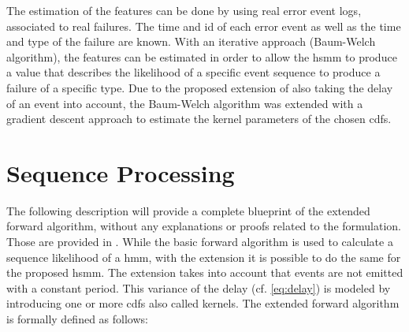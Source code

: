 \documentclass[mscthesis]{usiinfthesis}
\begin{document}
The estimation of the features can be done by using real error event logs,
associated to real failures. The time and id of each error event as well as the
time and type of the failure are known. With an iterative approach (Baum-Welch
algorithm), the features can be estimated in order to allow the \gls{hsmm} to
produce a value that describes the likelihood of a specific event sequence to
produce a failure of a specific type. Due to the proposed extension of also
taking the delay of an event into account, the Baum-Welch algorithm was
extended with a gradient descent approach to estimate the kernel parameters of
the chosen \glspl{cdf}.

\section{Sequence Processing}
\label{ch:event_sequ}

The following description will provide a complete blueprint of the extended
forward algorithm, without any explanations or proofs related to the
formulation. Those are provided in \cite{salfner08}. While the basic forward
algorithm is used to calculate a sequence likelihood of a \gls{hmm}, with the
extension it is possible to do the same for the proposed \gls{hsmm}. The
extension takes into account that events are not emitted with a constant period.
This variance of the delay (cf. \ref{eq:delay}) is modeled by introducing
one or more \glspl{cdf} also called kernels. The extended forward algorithm is
formally defined as follows:
\end{document}
